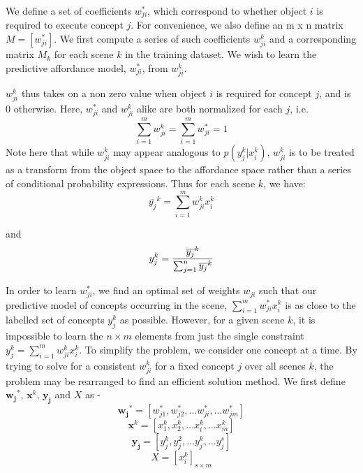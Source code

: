 We define a set of coefficients $w_{ji}^*$, which correspond to whether object $i$ is required to execute concept $j$. 
For convenience, we also define an m x n matrix $M = [w_{ji}^*]$. We first compute a series of such coefficients $w_{ji}^k$ and a corresponding matrix $M_k$ for each scene $k$ in the training dataset. We wish to learn the predictive affordance model, $w_{ji}^*$, from $w_{ji}^k$. 

$w_{ji}^k$ thus takes on a non zero value when object $i$ is required for concept $j$, and is $0$ otherwise. Here, $w_{ji}^*$ and $w_{ji}^k$ alike are both normalized for each $j$, i.e. 
\begin{equation}
\sum_{i=1}^m w_{ji}^k = \sum_{i=1}^m w_{ji}^* = 1
\end{equation}
Note here that while $w_{ji}^k$ may appear analogous to $p(y_j^k | x_i^k)$, $w_{ji}^k$ is to be treated as a transform from the object space to the affordance space rather than a series of conditional probability expressions. Thus for each scene $k$, we have:
\begin{equation}
\overline{y_j}^k = \sum_{i=1}^m w_{ji}^k x_i^k
\end{equation}

and 
\begin{equation}
y_j^k = {{\overline{y_j}^k} \over {\sum_{j=1}^n \overline{y_j}^k}} 
\end{equation}

In order to learn $w_{ji}^*$, we find an optimal set of weights $w_{ji}$ such that our predictive model of concepts occurring in the scene, $\sum_{i=1}^m w_{ji}^* x_i^k$ is as close to the labelled set of concepts $y_j^k$ as possible. However, for a given scene $k$, it is impossible to learn the $n\times m$ elements from just the single constraint $y_j^k=\sum_{i=1}^m w_{ji}^k x_i^k$. To simplify the problem, we consider one concept at a time. By trying to solve for a consistent $w_{ji}^k$ for a fixed concept $j$ over all scenes $k$, the problem may be rearranged to find an efficient solution method. We first define $\mathbf{w_j}^*$, $\mathbf{x}^k$, $\mathbf{y_j}$ and $X$ as - 
$$\mathbf{w_j}^*=[w_{j1}^*, w_{j2}^*, \dots w_{ji}^*, \dots w_{jm}^*]$$
$$\mathbf{x}^k=[x_1^k, x_2^k, \dots x_i^k, \dots x_m^k]$$
$$\mathbf{y_j}=[y_j^k, y_j^2, \dots y_j^k, \dots y_j^s]$$
$$X=[x_i^k]_{s \times m}$$

